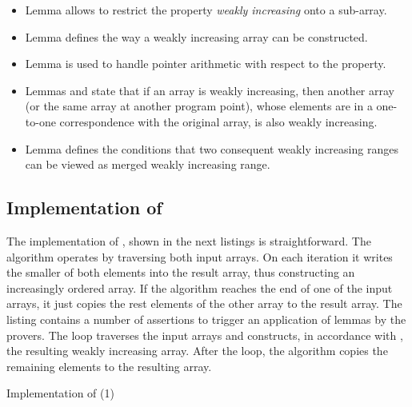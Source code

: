 \begin{itemize}
\item
Lemma  allows to restrict the property
\emph{weakly increasing} onto a sub-array.

\item
Lemma  defines the way a weakly
increasing array can be constructed.

\item
Lemma  is used to handle
pointer arithmetic with respect to the \WeaklyIncreasing property.

\item
Lemmas   and  state
that if an array is weakly increasing,
then another array (or the same array at another program point),
whose elements are in a one-to-one correspondence with the
original array, is also weakly increasing.

\item
Lemma  defines the conditions that two
consequent weakly increasing ranges
can be viewed as merged weakly increasing range.
\end{itemize}




\subsection{Implementation of \merge}

The implementation of \merge, shown in the next listings is straightforward.
The algorithm operates by traversing both input arrays.
On each iteration it writes the smaller of both elements into the result array,
thus constructing an increasingly ordered array.
If the algorithm reaches the end of one of the input arrays,
it just copies the rest elements of the other array to the result array.
The listing contains a number of assertions to trigger an application of lemmas by 
the provers.
The  loop traverses the input arrays and constructs, in accordance with
, the resulting weakly increasing array.
After the loop, the algorithm copies the remaining elements to the resulting array.


\begin{listing}[hbt]
\begin{minipage}{\textwidth}

\end{minipage}
\caption{\label{lst:merge-impl1}Implementation of \merge (1)}
\end{listing}

